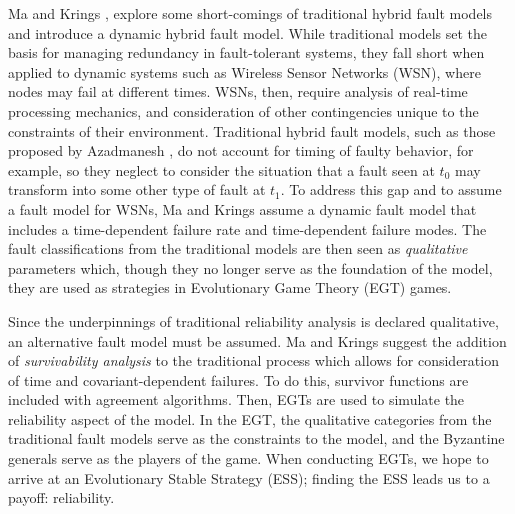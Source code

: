 \documentclass[twoside, conference]{IEEEtran}
\begin{document}
Ma and Krings \cite{Ma2008}, explore some short-comings of traditional hybrid fault models and introduce a dynamic hybrid fault model. While traditional models set the basis for managing redundancy in fault-tolerant systems, they fall short when applied to dynamic systems such as Wireless Sensor Networks (WSN), where nodes may fail at different times. WSNs, then, require analysis of real-time processing mechanics, and consideration of other contingencies unique to the constraints of their environment. Traditional hybrid fault models, such as those proposed by Azadmanesh \cite{Azadmanesh2000}, do not account for timing of faulty behavior, for example, so they neglect to consider the situation that a fault seen at $t_0$ may transform into some other type of fault at $t_1$. To address this gap and to assume a fault model for WSNs, Ma and Krings assume a dynamic fault model that includes a time-dependent failure rate and time-dependent failure modes. The fault classifications from the traditional models are then seen as \textit{qualitative} parameters which, though they no longer serve as the foundation of the model, they are used as strategies in Evolutionary Game Theory (EGT) games. \cite{Ma2008}

Since the underpinnings of traditional reliability analysis is declared qualitative, an alternative fault model must be assumed. Ma and Krings suggest the addition of \textit{survivability analysis} to the traditional process which allows for consideration of time and covariant-dependent failures. To do this, survivor functions are included with agreement algorithms. Then, EGTs are used to simulate the reliability aspect of the model. In the EGT, the qualitative categories from the traditional fault models serve as the constraints to the model, and the Byzantine generals serve as the players of the game. When conducting EGTs, we hope to arrive at an Evolutionary Stable Strategy (ESS); finding the ESS leads us to a payoff: reliability. \cite{Ma2008} 




\end{document}
